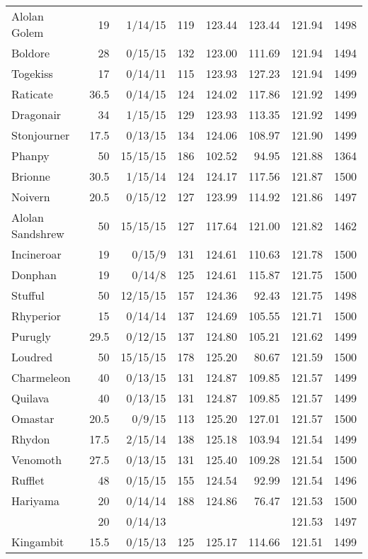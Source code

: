 \begin{longtable}{lrrrrrrr}
Alolan Golem & 19 & 1/14/15 & 119 & 123.44 & 123.44 & 121.94 & 1498\\
Boldore & 28 & 0/15/15 & 132 & 123.00 & 111.69 & 121.94 & 1494\\
Togekiss & 17 & 0/14/11 & 115 & 123.93 & 127.23 & 121.94 & 1499\\
Raticate & 36.5 & 0/14/15 & 124 & 124.02 & 117.86 & 121.92 & 1499\\
Dragonair & 34 & 1/15/15 & 129 & 123.93 & 113.35 & 121.92 & 1499\\
Stonjourner & 17.5 & 0/13/15 & 134 & 124.06 & 108.97 & 121.90 & 1499\\
Phanpy & 50 & 15/15/15 & 186 & 102.52 & 94.95 & 121.88 & 1364\\
Brionne & 30.5 & 1/15/14 & 124 & 124.17 & 117.56 & 121.87 & 1500\\
Noivern & 20.5 & 0/15/12 & 127 & 123.99 & 114.92 & 121.86 & 1497\\
Alolan Sandshrew & 50 & 15/15/15 & 127 & 117.64 & 121.00 & 121.82 & 1462\\
Incineroar & 19 & 0/15/9 & 131 & 124.61 & 110.63 & 121.78 & 1500\\
Donphan & 19 & 0/14/8 & 125 & 124.61 & 115.87 & 121.75 & 1500\\
Stufful & 50 & 12/15/15 & 157 & 124.36 & 92.43 & 121.75 & 1498\\
Rhyperior & 15 & 0/14/14 & 137 & 124.69 & 105.55 & 121.71 & 1500\\
Purugly & 29.5 & 0/12/15 & 137 & 124.80 & 105.21 & 121.62 & 1499\\
Loudred & 50 & 15/15/15 & 178 & 125.20 & 80.67 & 121.59 & 1500\\
Charmeleon & 40 & 0/13/15 & 131 & 124.87 & 109.85 & 121.57 & 1499\\
Quilava & 40 & 0/13/15 & 131 & 124.87 & 109.85 & 121.57 & 1499\\
Omastar & 20.5 & 0/9/15 & 113 & 125.20 & 127.01 & 121.57 & 1500\\
Rhydon & 17.5 & 2/15/14 & 138 & 125.18 & 103.94 & 121.54 & 1499\\
Venomoth & 27.5 & 0/13/15 & 131 & 125.40 & 109.28 & 121.54 & 1500\\
Rufflet & 48 & 0/15/15 & 155 & 124.54 & 92.99 & 121.54 & 1496\\
Hariyama & 20 & 0/14/14 & 188 & 124.86 & 76.47 & 121.53 & 1500\\
 & 20 & 0/14/13 & & & & 121.53 & 1497\\
Kingambit & 15.5 & 0/15/13 & 125 & 125.17 & 114.66 & 121.51 & 1499\\

\end{longtable}

